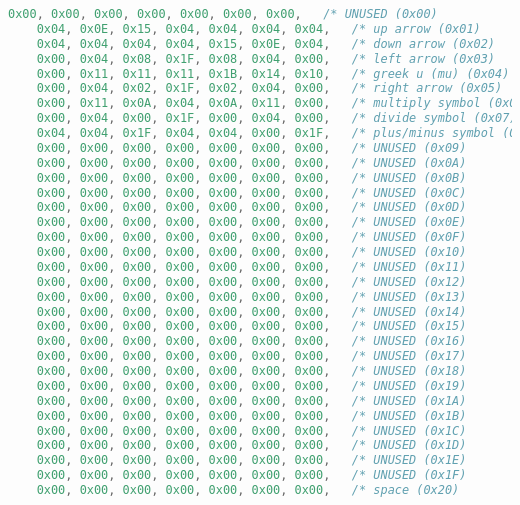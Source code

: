 \begin{lstlisting}[language=C]
    0x00, 0x00, 0x00, 0x00, 0x00, 0x00, 0x00,   /* UNUSED (0x00)            */
    0x04, 0x0E, 0x15, 0x04, 0x04, 0x04, 0x04,   /* up arrow (0x01)          */
    0x04, 0x04, 0x04, 0x04, 0x15, 0x0E, 0x04,   /* down arrow (0x02)        */
    0x00, 0x04, 0x08, 0x1F, 0x08, 0x04, 0x00,   /* left arrow (0x03)        */
    0x00, 0x11, 0x11, 0x11, 0x1B, 0x14, 0x10,   /* greek u (mu) (0x04)      */
    0x00, 0x04, 0x02, 0x1F, 0x02, 0x04, 0x00,   /* right arrow (0x05)       */
    0x00, 0x11, 0x0A, 0x04, 0x0A, 0x11, 0x00,   /* multiply symbol (0x06)   */
    0x00, 0x04, 0x00, 0x1F, 0x00, 0x04, 0x00,   /* divide symbol (0x07)     */
    0x04, 0x04, 0x1F, 0x04, 0x04, 0x00, 0x1F,   /* plus/minus symbol (0x08) */
    0x00, 0x00, 0x00, 0x00, 0x00, 0x00, 0x00,   /* UNUSED (0x09)            */
    0x00, 0x00, 0x00, 0x00, 0x00, 0x00, 0x00,   /* UNUSED (0x0A)            */
    0x00, 0x00, 0x00, 0x00, 0x00, 0x00, 0x00,   /* UNUSED (0x0B)            */
    0x00, 0x00, 0x00, 0x00, 0x00, 0x00, 0x00,   /* UNUSED (0x0C)            */
    0x00, 0x00, 0x00, 0x00, 0x00, 0x00, 0x00,   /* UNUSED (0x0D)            */
    0x00, 0x00, 0x00, 0x00, 0x00, 0x00, 0x00,   /* UNUSED (0x0E)            */
    0x00, 0x00, 0x00, 0x00, 0x00, 0x00, 0x00,   /* UNUSED (0x0F)            */
    0x00, 0x00, 0x00, 0x00, 0x00, 0x00, 0x00,   /* UNUSED (0x10)            */
    0x00, 0x00, 0x00, 0x00, 0x00, 0x00, 0x00,   /* UNUSED (0x11)            */
    0x00, 0x00, 0x00, 0x00, 0x00, 0x00, 0x00,   /* UNUSED (0x12)            */
    0x00, 0x00, 0x00, 0x00, 0x00, 0x00, 0x00,   /* UNUSED (0x13)            */
    0x00, 0x00, 0x00, 0x00, 0x00, 0x00, 0x00,   /* UNUSED (0x14)            */
    0x00, 0x00, 0x00, 0x00, 0x00, 0x00, 0x00,   /* UNUSED (0x15)            */
    0x00, 0x00, 0x00, 0x00, 0x00, 0x00, 0x00,   /* UNUSED (0x16)            */
    0x00, 0x00, 0x00, 0x00, 0x00, 0x00, 0x00,   /* UNUSED (0x17)            */
    0x00, 0x00, 0x00, 0x00, 0x00, 0x00, 0x00,   /* UNUSED (0x18)            */
    0x00, 0x00, 0x00, 0x00, 0x00, 0x00, 0x00,   /* UNUSED (0x19)            */
    0x00, 0x00, 0x00, 0x00, 0x00, 0x00, 0x00,   /* UNUSED (0x1A)            */
    0x00, 0x00, 0x00, 0x00, 0x00, 0x00, 0x00,   /* UNUSED (0x1B)            */
    0x00, 0x00, 0x00, 0x00, 0x00, 0x00, 0x00,   /* UNUSED (0x1C)            */
    0x00, 0x00, 0x00, 0x00, 0x00, 0x00, 0x00,   /* UNUSED (0x1D)            */
    0x00, 0x00, 0x00, 0x00, 0x00, 0x00, 0x00,   /* UNUSED (0x1E)            */
    0x00, 0x00, 0x00, 0x00, 0x00, 0x00, 0x00,   /* UNUSED (0x1F)            */
    0x00, 0x00, 0x00, 0x00, 0x00, 0x00, 0x00,   /* space (0x20)             */

\end{lstlisting}
